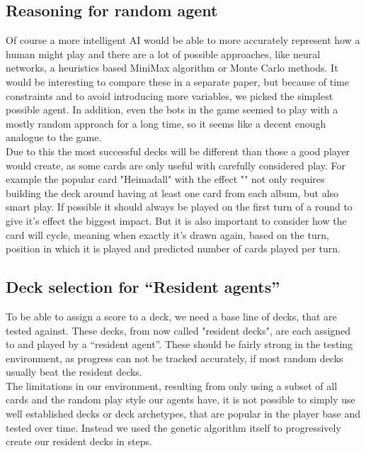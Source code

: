 \subsection{Reasoning for random agent}
\label{sec:method:agents:other}
Of course a more intelligent AI would be able to more accurately represent how a human might play and there are a lot of possible approaches, like neural networks, a heuristics based MiniMax algorithm or Monte Carlo methods. It would be interesting to compare these in a separate paper, but because of time constraints and to avoid introducing more variables, we picked the simplest possible agent. In addition, even the bots in the game seemed to play with a mostly random approach for a long time, so it seems like a decent enough analogue to the game. \\
Due to this the most successful decks will be different than those a good player would create, as some cards are only useful with carefully considered play. For example the popular card "Heimadall" with the effect "" not only requires building the deck around having at least one card from each album, but also smart play. If possible it should always be played on the first turn of a round to give it's effect the biggest impact. But it is also important to consider how the card will cycle, meaning when exactly it's drawn again, based on the turn, position in which it is played and predicted number of cards played per turn. \\

\subsection{Deck selection for “Resident agents”}
\label{sec:method:agents:resident_decks}
To be able to assign a score to a deck, we need a base line of decks, that are tested against. These decks, from now called "resident decks", are each assigned to and played by a “resident agent”. These should be fairly strong in the testing environment, as progress can not be tracked accurately, if most random decks usually beat the resident decks. \\
The limitations in our environment, resulting from only using a subset of all cards and the random play style our agents have, it is not possible to simply use well established decks or deck archetypes, that are popular in the player base and tested over time. Instead we used the genetic algorithm itself to progressively create our resident decks in steps.

